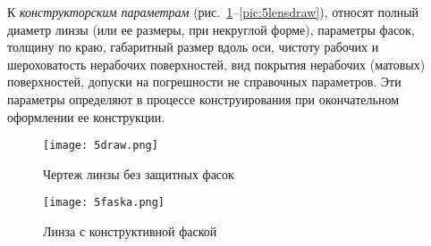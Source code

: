 К \textit{конструкторским параметрам} (рис.~\ref{pic:5draw}--\ref{pic:5lensdraw}), относят полный диаметр линзы (или ее размеры, при некруглой форме), параметры фасок, толщину по краю, габаритный размер вдоль оси, чистоту рабочих и шероховатость нерабочих поверхностей, вид покрытия нерабочих (матовых) поверхностей, допуски на погрешности не справочных параметров. Эти параметры определяют в процессе конструирования при окончательном оформлении ее конструкции.

\begin{figure}[h!]
	\caption{Чертеж линзы без защитных фасок}
	\texttt{[image: 5draw.png]}
	\label{pic:5draw}
\end{figure}

\begin{figure}[h!]
	\caption{Линза с конструктивной фаской}
	\texttt{[image: 5faska.png]}
	\label{pic:5faska}
\end{figure}

